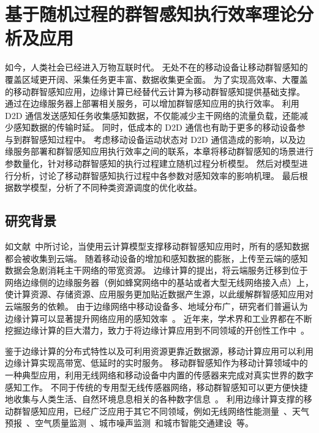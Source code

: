 

\chapter{基于随机过程的群智感知执行效率理论分析及应用}

如今，人类社会已经进入万物互联时代。
无处不在的移动设备让移动群智感知的覆盖区域更开阔、采集任务更丰富、数据收集更全面。
为了实现高效率、大覆盖的移动群智感知应用，边缘计算已经替代云计算为移动群智感知提供基础支撑。
通过在边缘服务器上部署相关服务，可以增加群智感知应用的执行效率。
利用 D2D 通信发送感知任务收集感知数据，不仅能减少主干网络的流量负载，还能减少感知数据的传输时延。
同时，低成本的 D2D 通信也有助于更多的移动设备参与到群智感知过程中。
考虑移动设备运动状态对 D2D 通信造成的影响，以及边缘服务部署和群智感知应用执行效率之间的联系，本章将移动群智感知的场景进行参数量化，针对移动群智感知的执行过程建立随机过程分析模型。
然后对模型进行分析，讨论了移动群智感知执行过程中各参数对感知效率的影响机理。
最后根据数学模型，分析了不同种类资源调度的优化收益。

\section{研究背景}

如文献~中所讨论，当使用云计算模型支撑移动群智感知应用时，所有的感知数据都会被收集到云端。
随着移动设备的增加和感知数据的膨胀，上传至云端的感知数据会急剧消耗主干网络的带宽资源。
边缘计算的提出，将云端服务迁移到位于网络边缘侧的边缘服务器（例如蜂窝网络中的基站或者大型无线网络接入点）上，使计算资源、存储资源、应用服务更加贴近数据产生源，以此缓解群智感知应用对云端服务的依赖。
由于边缘网络中移动设备多、地域分布广，研究者们普遍认为边缘计算可以显著提升网络应用的感知效率~\cite{DBLP:conf/sigcomm/BonomiMZA12}。
近年来，学术界和工业界都在不断挖掘边缘计算的巨大潜力，致力于将边缘计算应用到不同领域的开创性工作中~\cite{DBLP:journals/access/MarjanovicAZ18,DBLP:journals/iotj/ChiangZ16}。


鉴于边缘计算的分布式特性以及可利用资源更靠近数据源，移动计算应用可以利用边缘计算实现高带宽、低延时的实时服务。
移动群智感知作为移动计算领域中的一种典型应用，利用无线网络和移动设备中内置的传感器来完成对真实世界的数字感知工作。
不同于传统的专用型无线传感器网络，移动群智感知可以更方便快捷地收集与人类生活、自然环境息息相关的各种数字信息~\cite{DBLP:journals/cm/GuoCZYC16}。
利用边缘计算支撑的移动群智感知应用，已经广泛应用于其它不同领域，例如无线网络性能测量~\cite{DBLP:journals/cm/RosenLLCMB14}、天气预报~\cite{DBLP:journals/tpds/ZhaoMTL15}、空气质量监测~\cite{DBLP:conf/huc/ZhangXWC14}、城市噪声监测~\cite{DBLP:conf/huc/ZhengLWZLC14}和城市智能交通建设~\cite{DBLP:conf/icdcs/ZhouJL15}等。

